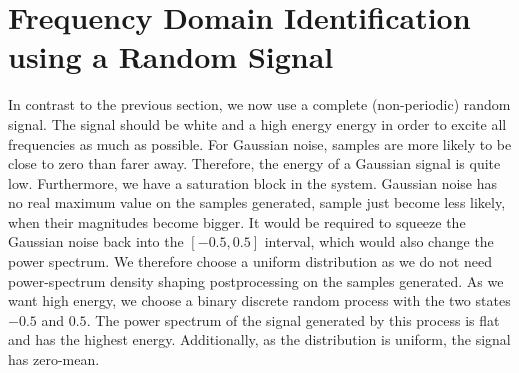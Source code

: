 \documentclass{scrartcl}
\begin{document}
\clearpage
\section{Frequency Domain Identification using a Random Signal}

In contrast to the previous section, we now use a complete (non-periodic) random signal.
The signal should be white and a high energy energy in order to excite all frequencies as much as possible. 
For Gaussian noise, samples are more likely to be close to zero than farer away. Therefore, the energy of a Gaussian signal is quite low.
Furthermore, we have a saturation block in the system.
Gaussian noise has no real maximum value on the samples generated, sample just become less likely, when their magnitudes become bigger.
It would be required to squeeze the Gaussian noise back into the $[-0.5, 0.5]$ interval, which would also change the power spectrum.
We therefore choose a uniform distribution as we do not need power-spectrum density shaping postprocessing on the samples generated.
As we want high energy, we choose a binary discrete random process with the two states $-0.5$ and $0.5$.
The power spectrum of the signal generated by this process is flat and has the highest energy.
Additionally, as the distribution is uniform, the signal has zero-mean.
\end{document}
